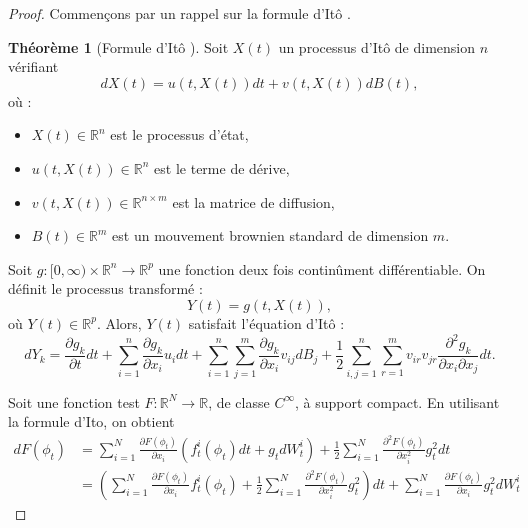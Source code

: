 \documentclass[a4paper,10pt]{article}
\theoremstyle{definition} %
\theoremstyle{definition} %
\theoremstyle{definition} %
\newtheorem{theorem}[definition]{Théorème}
\theoremstyle{definition} %
\begin{document}
\begin{proof}
Commençons par un rappel sur la formule d'Itô . 
\begin{theorem}[Formule d'Itô \cite{Oksendal2003}]
Soit \( X(t) \) un processus d’Itô de dimension \( n \) vérifiant  
\[
dX(t) = u(t, X(t)) dt + v(t, X(t)) dB(t),
\]
où :
\begin{itemize}
    \item \( X(t) \in \mathbb{R}^n \) est le processus d’état,
    \item \( u(t, X(t)) \in \mathbb{R}^n \) est le terme de dérive,
    \item \( v(t, X(t)) \in \mathbb{R}^{n \times m} \) est la matrice de diffusion,
    \item \( B(t) \in \mathbb{R}^m \) est un mouvement brownien standard de dimension \( m \).
\end{itemize}

Soit \( g: [0, \infty) \times \mathbb{R}^n \to \mathbb{R}^p \) une fonction deux fois continûment différentiable.  
On définit le processus transformé :
\[
Y(t) = g(t, X(t)),
\]
où \( Y(t) \in \mathbb{R}^p \).  
Alors, \( Y(t) \) satisfait l’équation d’Itô :
\[
dY_k = \frac{\partial g_k}{\partial t} dt 
+ \sum_{i=1}^{n} \frac{\partial g_k}{\partial x_i} u_i dt 
+ \sum_{i=1}^{n} \sum_{j=1}^{m} \frac{\partial g_k}{\partial x_i} v_{ij} dB_j
+ \frac{1}{2} \sum_{i,j=1}^{n} \sum_{r=1}^{m} v_{ir} v_{jr} \frac{\partial^2 g_k}{\partial x_i \partial x_j} dt.
\]
\end{theorem}
\vspace{3em}



Soit une fonction test $F: \mathbb{R}^N \rightarrow \mathbb{R}$, de classe $C^{\infty}$, à support compact. En utilisant la formule d'Ito, on obtient
\begin{align*}
    dF(\phi_t) &= \sum_{i=1}^N \frac{\partial F(\phi_t)}{\partial x_i} (f^i_t(\phi_t)dt + g_tdW^i_t) + \frac{1}{2} \sum_{i=1}^N  \frac{\partial^2 F(\phi_t)}{\partial x_i^2} g_t^2 dt \\
    &= \left(\sum_{i=1}^N \frac{\partial F(\phi_t)}{\partial x_i} f^i_t(\phi_t) + \frac{1}{2} \sum_{i=1}^N  \frac{\partial^2 F(\phi_t)}{\partial x_i^2} g_t^2\right)dt + \sum_{i=1}^N \frac{\partial F(\phi_t)}{\partial x_i}  g_t^2dW^i_t
\end{align*}


\end{proof}
\end{document}
